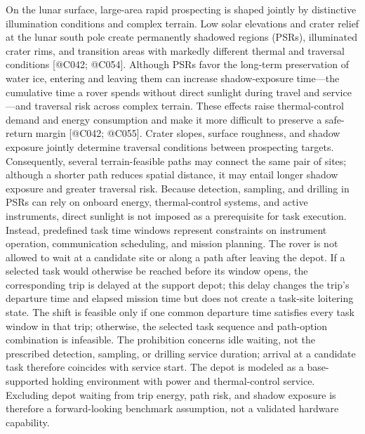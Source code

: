 \documentclass[
  11pt,
]{article}
\begin{document}
On the lunar surface, large-area rapid prospecting is shaped jointly by
distinctive illumination conditions and complex terrain. Low solar
elevations and crater relief at the lunar south pole create permanently
shadowed regions (PSRs), illuminated crater rims, and transition areas
with markedly different thermal and traversal conditions {[}@C042;
@C054{]}. Although PSRs favor the long-term preservation of water ice,
entering and leaving them can increase shadow-exposure time---the
cumulative time a rover spends without direct sunlight during travel and
service---and traversal risk across complex terrain. These effects raise
thermal-control demand and energy consumption and make it more difficult
to preserve a safe-return margin {[}@C042; @C055{]}. Crater slopes,
surface roughness, and shadow exposure jointly determine traversal
conditions between prospecting targets. Consequently, several
terrain-feasible paths may connect the same pair of sites; although a
shorter path reduces spatial distance, it may entail longer shadow
exposure and greater traversal risk. Because detection, sampling, and
drilling in PSRs can rely on onboard energy, thermal-control systems,
and active instruments, direct sunlight is not imposed as a prerequisite
for task execution. Instead, predefined task time windows represent
constraints on instrument operation, communication scheduling, and
mission planning. The rover is not allowed to wait at a candidate site
or along a path after leaving the depot. If a selected task would
otherwise be reached before its window opens, the corresponding trip is
delayed at the support depot; this delay changes the trip's departure
time and elapsed mission time but does not create a task-site loitering
state. The shift is feasible only if one common departure time satisfies
every task window in that trip; otherwise, the selected task sequence
and path-option combination is infeasible. The prohibition concerns idle
waiting, not the prescribed detection, sampling, or drilling service
duration; arrival at a candidate task therefore coincides with service
start. The depot is modeled as a base-supported holding environment with
power and thermal-control service. Excluding depot waiting from trip
energy, path risk, and shadow exposure is therefore a forward-looking
benchmark assumption, not a validated hardware capability.
\end{document}

